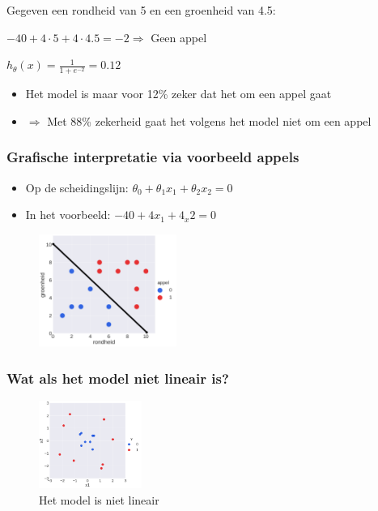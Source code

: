 \documentclass{article}
\begin{document}
Gegeven een rondheid van 5 en een groenheid van 4.5:

\begin{center}
    $-40 + 4 \cdot 5 + 4 \cdot 4.5 = -2 \Rightarrow $ Geen appel

    $h_{\theta}(x) = \frac{1}{1 + e^{-2}} = 0.12$
\end{center}

\begin{itemize}
    \item Het model is maar voor 12\% zeker dat het om een appel gaat
    \item $\Rightarrow$ Met 88\% zekerheid gaat het volgens het model niet om een appel
\end{itemize}

\subsubsection{Grafische interpretatie via voorbeeld appels}

\begin{itemize}
    \item Op de scheidingslijn: $\theta_0 + \theta_1x_1 + \theta_2x_2 = 0$
    \item In het voorbeeld: $-40 + 4x_1 + 4_x2 = 0$
\end{itemize}

\begin{figure}[H]
    \centering
    \includegraphics[width=0.4\textwidth]{logistic-grafische.png}
    \caption{}
\end{figure}

\subsubsection{Wat als het model niet lineair is?}

\begin{figure}[H]
    \centering
    \includegraphics[width=0.3\textwidth]{logistic-circle.png}
    \caption{Het model is niet lineair}
\end{figure}
\end{document}
